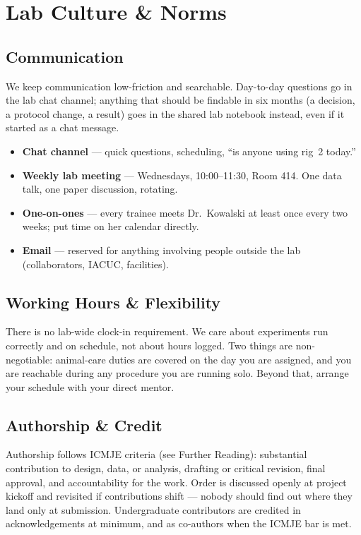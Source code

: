 \section{Lab Culture \& Norms}
\label{sec:culture}

\subsection*{Communication}
We keep communication low-friction and searchable. Day-to-day questions go in the lab chat
channel; anything that should be findable in six months (a decision, a protocol change, a
result) goes in the shared lab notebook instead, even if it started as a chat message.

\begin{itemize}[leftmargin=1.3em]
  \item \textbf{Chat channel} --- quick questions, scheduling, ``is anyone using rig~2 today.''
  \item \textbf{Weekly lab meeting} --- Wednesdays, 10:00--11:30, Room 414. One data talk,
        one paper discussion, rotating.
  \item \textbf{One-on-ones} --- every trainee meets Dr.\ Kowalski at least once every two
        weeks; put time on her calendar directly.
  \item \textbf{Email} --- reserved for anything involving people outside the lab
        (collaborators, IACUC, facilities).
\end{itemize}

\subsection*{Working Hours \& Flexibility}
There is no lab-wide clock-in requirement. We care about experiments run correctly and on
schedule, not about hours logged. Two things are non-negotiable: animal-care duties are
covered on the day you are assigned, and you are reachable during any procedure you are
running solo. Beyond that, arrange your schedule with your direct mentor.

\subsection*{Authorship \& Credit}
Authorship follows ICMJE criteria (see Further Reading): substantial contribution to design,
data, or analysis, drafting or critical revision, final approval, and accountability for the
work. Order is discussed openly at project kickoff and revisited if contributions shift ---
nobody should find out where they land only at submission. Undergraduate contributors are
credited in acknowledgements at minimum, and as co-authors when the ICMJE bar is met.

